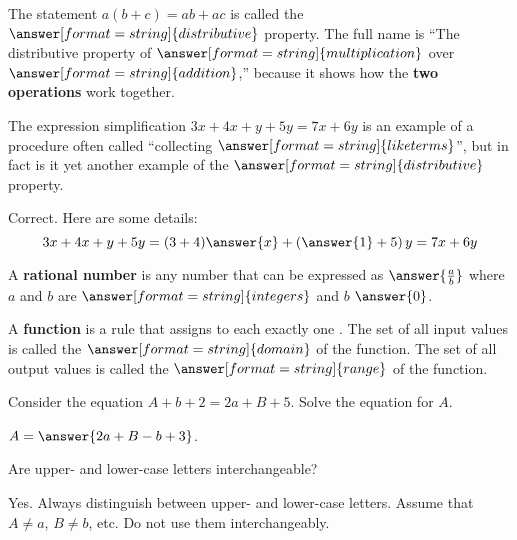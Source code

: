 \documentclass[nooutcomes]{ximera}
\begin{document}
\begin{problem}
The statement $a(b+c)=ab+ac$ is called the $\answer[format=string]{distributive}$ property.  The full name is ``The distributive property of $\answer[format=string]{multiplication}$ over $\answer[format=string]{addition}$,'' because it shows how the \textbf{two operations} work together. 
\end{problem}

\begin{problem}
The expression simplification $3x+4x+y+5y=7x+6y$ is an example of a procedure often called ``collecting 
$\answer[format=string]{like terms}$'', but in fact is it yet another example of the 
$\answer[format=string]{distributive}$ property. 
\begin{problem}
Correct.  Here are some details: 
\[
3x+4x+y+5y=(3+4)\answer{x}+\left(\answer{1}+5\right)y=7x+6y
\]
\end{problem}
\end{problem}

\begin{problem}
A \textbf{rational number} is any number that can be expressed as $\answer{\frac{a}{b}}$ where $a$ and $b$ are $\answer[format=string]{integers}$ and $b$ \wordChoice{\choice{$=$} \choice{$<$} \choice{$>$} \choice[correct]{$\ne$}} $\answer{0}$.
\end{problem}

\begin{problem}
A \textbf{function} is a rule that assigns to each 
 exactly one .  The set of 
all input values is called the $\answer[format=string]{domain}$ of the function.  The set of 
all output values is called the $\answer[format=string]{range}$ of the function.
\end{problem}

\begin{problem}
Consider the equation $A+b+2=2a+B+5$.  Solve the equation for $A$.  

$A=\answer{2a+B-b+3}$.  
\begin{hint}
Are upper- and lower-case letters interchangeable?  
\end{hint}
\begin{feedback}[correct]
Yes.  Always distinguish between upper- and lower-case letters.  Assume that $A\ne a$, $B\ne b$, etc.  Do not use them interchangeably.  
\end{feedback}
\end{problem}
\end{document}
